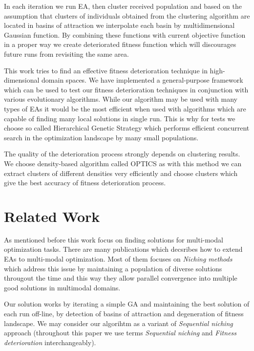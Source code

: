 In each iteration we run EA, then cluster received population and
based on the assumption that clusters of individuals obtained from
the clustering algorithm are located in basins of attraction we interpolate
 each basin by multidimensional Gaussian function. By combining
these functions with current objective function in a proper way we
create deteriorated fitness function which will discourages future runs
from revisiting the same area.

This work tries to find an effective fitness deterioration technique in
high-dimensional domain spaces. We have implemented a general-purpose framework which can be
used to test our fitness deterioration techniques in conjunction with
various evolutionary algorithms. While our algorithm may be used with many types
of EAs it would be the most efficient when used with algorithms which are capable 
of finding many local solutions in single run. This is why for tests
we choose so called Hierarchical Genetic Strategy which performs efficient
concurrent search in the optimization landscape by many small populations.

The quality of the deterioration process strongly depends on clustering results.
We choose density-based algorithm called OPTICS as with this method we can extract clusters of
different densities very efficiently and choose clusters which give the
best accuracy of fitness deterioration process.

\section{Related Work}

As mentioned before this work focus on finding solutions for multi-modal
optimization tasks. There are many publications which decsribes how to extend
EAs to multi-modal optimization. Most of them focuses on 
\textit{Niching methods} \cite{niching,sharing,dynsharing} which address this
issue by maintaining a population of diverse solutions througout the time and this way they allow
parallel convergence into multiple good solutions in multimodal domains.

Our solution works by iterating a simple GA and maintaining the best solution of
each run off-line, by detection of basins of attraction and degeneration of
fitness landscape. We may consider our algorihtm as a variant of
\textit{Sequential niching} approach (throughout this paper we use terms 
\textit{Sequential niching} and \textit{Fitness deterioration} interchangeably).

